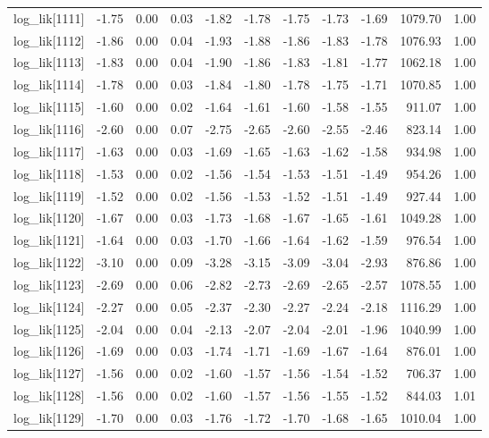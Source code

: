 \begin{table}[ht]
\begin{tabular}{rrrrrrrrrrr}
  log\_lik[1111] & -1.75 & 0.00 & 0.03 & -1.82 & -1.78 & -1.75 & -1.73 & -1.69 & 1079.70 & 1.00 \\ 
  log\_lik[1112] & -1.86 & 0.00 & 0.04 & -1.93 & -1.88 & -1.86 & -1.83 & -1.78 & 1076.93 & 1.00 \\ 
  log\_lik[1113] & -1.83 & 0.00 & 0.04 & -1.90 & -1.86 & -1.83 & -1.81 & -1.77 & 1062.18 & 1.00 \\ 
  log\_lik[1114] & -1.78 & 0.00 & 0.03 & -1.84 & -1.80 & -1.78 & -1.75 & -1.71 & 1070.85 & 1.00 \\ 
  log\_lik[1115] & -1.60 & 0.00 & 0.02 & -1.64 & -1.61 & -1.60 & -1.58 & -1.55 & 911.07 & 1.00 \\ 
  log\_lik[1116] & -2.60 & 0.00 & 0.07 & -2.75 & -2.65 & -2.60 & -2.55 & -2.46 & 823.14 & 1.00 \\ 
  log\_lik[1117] & -1.63 & 0.00 & 0.03 & -1.69 & -1.65 & -1.63 & -1.62 & -1.58 & 934.98 & 1.00 \\ 
  log\_lik[1118] & -1.53 & 0.00 & 0.02 & -1.56 & -1.54 & -1.53 & -1.51 & -1.49 & 954.26 & 1.00 \\ 
  log\_lik[1119] & -1.52 & 0.00 & 0.02 & -1.56 & -1.53 & -1.52 & -1.51 & -1.49 & 927.44 & 1.00 \\ 
  log\_lik[1120] & -1.67 & 0.00 & 0.03 & -1.73 & -1.68 & -1.67 & -1.65 & -1.61 & 1049.28 & 1.00 \\ 
  log\_lik[1121] & -1.64 & 0.00 & 0.03 & -1.70 & -1.66 & -1.64 & -1.62 & -1.59 & 976.54 & 1.00 \\ 
  log\_lik[1122] & -3.10 & 0.00 & 0.09 & -3.28 & -3.15 & -3.09 & -3.04 & -2.93 & 876.86 & 1.00 \\ 
  log\_lik[1123] & -2.69 & 0.00 & 0.06 & -2.82 & -2.73 & -2.69 & -2.65 & -2.57 & 1078.55 & 1.00 \\ 
  log\_lik[1124] & -2.27 & 0.00 & 0.05 & -2.37 & -2.30 & -2.27 & -2.24 & -2.18 & 1116.29 & 1.00 \\ 
  log\_lik[1125] & -2.04 & 0.00 & 0.04 & -2.13 & -2.07 & -2.04 & -2.01 & -1.96 & 1040.99 & 1.00 \\ 
  log\_lik[1126] & -1.69 & 0.00 & 0.03 & -1.74 & -1.71 & -1.69 & -1.67 & -1.64 & 876.01 & 1.00 \\ 
  log\_lik[1127] & -1.56 & 0.00 & 0.02 & -1.60 & -1.57 & -1.56 & -1.54 & -1.52 & 706.37 & 1.00 \\ 
  log\_lik[1128] & -1.56 & 0.00 & 0.02 & -1.60 & -1.57 & -1.56 & -1.55 & -1.52 & 844.03 & 1.01 \\ 
  log\_lik[1129] & -1.70 & 0.00 & 0.03 & -1.76 & -1.72 & -1.70 & -1.68 & -1.65 & 1010.04 & 1.00 \\ 

\end{tabular}
\end{table}
